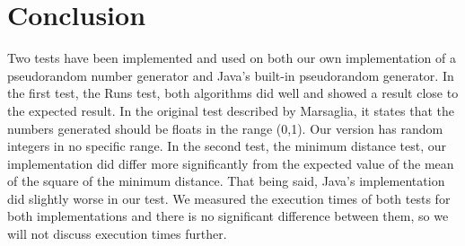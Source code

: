\section{Conclusion}
Two tests have been implemented and used on both our own implementation of a pseudorandom number generator and Java's built-in pseudorandom generator. In the first test, the Runs test, both algorithms did well and showed a result close to the expected result. In the original test described by Marsaglia, it states that the numbers generated should be floats in the range (0,1). Our version has random integers in no specific range. In the second test, the minimum distance test, our implementation did differ more significantly from the expected value of the mean of the square of the minimum distance. That being said, Java's implementation did slightly worse in our test. We measured the execution times of both tests for both implementations and there is no significant difference between them, so we will not discuss execution times further.